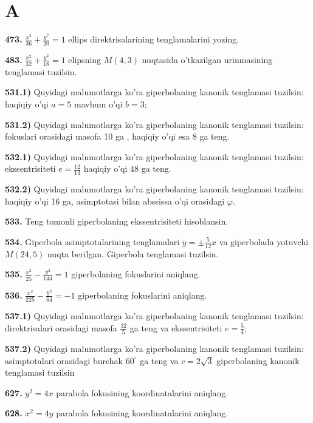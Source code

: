 \section{A}\label{a}

\textbf{473.} \(\frac{x^{2}}{36} + \frac{y^{2}}{20} = 1\) ellips direktrisalarining tenglamalarini yozing.

\textbf{483.} \(\frac{x^{2}}{32} + \frac{y^{2}}{18} = 1\) elipsning \(M(4,3)\) nuqtasida o'tkazilgan urinmasining tenglamasi tuzilsin.

\textbf{531.1)} Quyidagi malumotlarga ko'ra giperbolaning kanonik tenglamasi tuzilsin: haqiqiy o'qi \(a = 5\) mavhum o'qi \(b = 3\);

\textbf{531.2)} Quyidagi malumotlarga ko'ra giperbolaning kanonik tenglamasi tuzilsin: fokuslari orasidagi masofa 10 ga , haqiqiy o'qi esa 8 ga teng.

\textbf{532.1)} Quyidagi malumotlarga ko'ra giperbolaning kanonik tenglamasi tuzilsin: ekssentrisiteti \(e = \frac{12}{13}\) haqiqiy o'qi 48 ga teng.

\textbf{532.2)} Quyidagi malumotlarga ko'ra giperbolaning kanonik tenglamasi tuzilsin: haqiqiy o'qi 16 ga, asimptotasi bilan abssissa o'qi orasidagi \(\varphi\).

\textbf{533.} Teng tomonli giperbolaning ekssentrisiteti hisoblansin.

\textbf{534.} Giperbola asimptotalarining tenglamalari \(y = \pm \frac{5}{12}x\) va giperbolada yotuvchi \(M(24,5)\) nuqta berilgan. Giperbola tenglamasi tuzilsin.

\textbf{535.} \(\frac{x^{2}}{25} - \frac{y^{2}}{144} = 1\) giperbolaning fokuslarini aniqlang.

\textbf{536.} \(\frac{x^{2}}{225} - \frac{y^{2}}{64} = - 1\) giperbolaning fokuslarini aniqlang.

\textbf{537.1)} Quyidagi malumotlarga ko'ra giperbolaning kanonik tenglamasi tuzilsin: direktrisalari orasidagi masofa \(\frac{32}{5}\) ga teng va ekssentrisiteti \(e = \frac{5}{4}\);

\textbf{537.2)} Quyidagi malumotlarga ko'ra giperbolaning kanonik tenglamasi tuzilsin: asimptotalari orasidagi burchak \(60^{\circ}\) ga teng va \(c = 2\sqrt{3}\) giperbolaning kanonik tenglamasi tuzilsin

\textbf{627.} \(y^{2} = 4x\) parabola fokusining koordinatalarini aniqlang.

\textbf{628.} \(x^{2} = 4y\) parabola fokusining koordinatalarini aniqlang.

